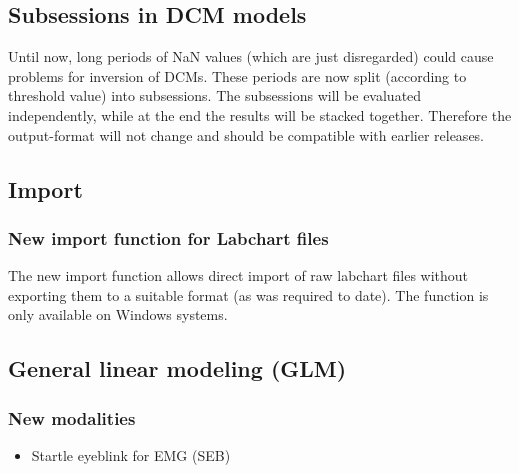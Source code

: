 \documentclass[english]{article}
\numberwithin{equation}{section}
\numberwithin{figure}{section}
\begin{document}
\subsection*{Subsessions in DCM models}

Until now, long periods of NaN values (which are just disregarded)
could cause problems for inversion of DCMs. These periods are now
split (according to threshold value) into subsessions. The subsessions
will be evaluated independently, while at the end the results will
be stacked together. Therefore the output-format will not change and
should be compatible with earlier releases.

\subsection*{Import}

\subsubsection*{New import function for Labchart files}

The new import function allows direct import of raw labchart files
without exporting them to a suitable format (as was required to date).
The function is only available on Windows systems.

\subsection*{General linear modeling (GLM)}

\subsubsection*{New modalities}
\begin{itemize}
\item Startle eyeblink for EMG (SEB)
\end{itemize}
\end{document}
